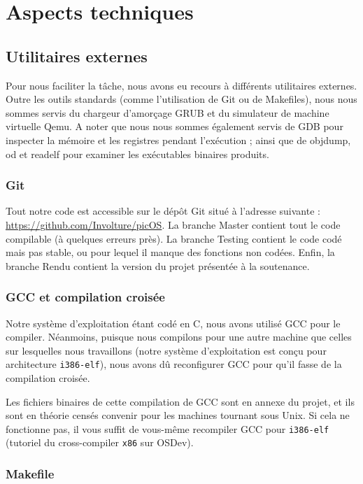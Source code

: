 \documentclass[a4paper, 11pt, twoside]{article}
\begin{document}
\section{Aspects techniques}

\subsection{Utilitaires externes}

Pour nous faciliter la tâche, nous avons eu recours à différents utilitaires
externes. Outre les outils standards (comme l'utilisation de Git ou de
Makefiles), nous nous sommes servis du chargeur d'amorçage GRUB et du simulateur
de machine virtuelle Qemu. A noter que nous nous sommes également servis de GDB pour inspecter la mémoire et les registres pendant l'exécution ; ainsi que de objdump, od et readelf pour examiner les exécutables binaires produits.

\subsubsection{Git}

Tout notre code est accessible sur le dépôt Git situé à l'adresse suivante :
\url{https://github.com/Involture/picOS}. La branche Master contient tout le
code compilable (à quelques erreurs près). La branche Testing contient le code
codé mais pas stable, ou pour lequel il manque des fonctions non codées. Enfin,
la branche Rendu contient la version du projet présentée à la soutenance.

\subsubsection{GCC et compilation croisée}

Notre système d'exploitation étant codé en C, nous avons utilisé GCC pour le
compiler. Néanmoins, puisque nous compilons pour une autre machine que celles
sur lesquelles nous travaillons (notre système d'exploitation est conçu pour
architecture \texttt{i386-elf}), nous avons dû reconfigurer GCC pour qu'il fasse de la
compilation croisée.

Les fichiers binaires de cette compilation de GCC sont en annexe du projet, et
ils sont en théorie censés convenir pour les machines tournant sous Unix. Si
cela ne fonctionne pas, il vous suffit de vous-même recompiler GCC pour
\texttt{i386-elf} (tutoriel du cross-compiler \texttt{x86} sur OSDev).

\subsubsection{Makefile}
\end{document}
